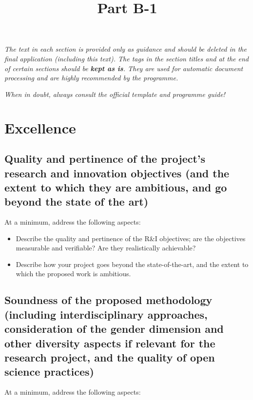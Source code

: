 \documentclass[11pt,draftproposal]{msca-pf}
\title{Part B-1}
\author{}
\date{}
\begin{document}
\maketitle

\textit{The text in each section is provided only as guidance and should be deleted
in the final application (including this text). The tags in the section titles
and at the end of certain sections should be \textbf{kept as is}. They are used for
automatic document processing and are highly recommended by the programme.}

\textit{When in doubt, always consult the official template and programme guide!}

\section{Excellence }
\label{sc:excellence}

\subsection{
    Quality and pertinence of the project's research and innovation objectives
    (and the extent to which they are ambitious, and go beyond the state of the art)}
\label{ssc:excellence:quality}

At a minimum, address the following aspects:

\begin{itemize}
    \item Describe the quality and pertinence of the R\&I objectives; are the
    objectives measurable and verifiable? Are they realistically achievable?

    \item Describe how your project goes beyond the state-of-the-art, and the
    extent to which the proposed work is ambitious.
\end{itemize}

\subsection{
    Soundness of the proposed methodology
    (including interdisciplinary approaches, consideration of the gender
    dimension and other diversity aspects if relevant for the research project,
    and the quality of open science practices)}
\label{ssc:excellence:methodology}

At a minimum, address the following aspects:
\end{document}
